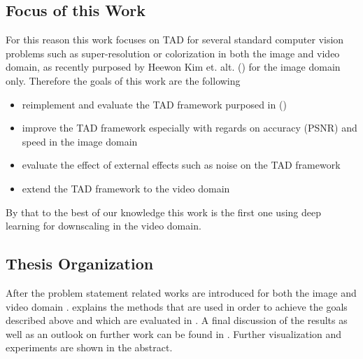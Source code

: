 \subsection{Focus of this Work}
For this reason this work focuses on \ac{TAD} for several standard
computer vision problems such as super-resolution or colorization in both the
image and video domain, as recently purposed by Heewon Kim et. alt. (\cite{TAID})
for the image domain only. Therefore the goals of this work are the following

\begin{itemize}
\item reimplement and evaluate the TAD framework purposed in (\cite{TAID})
\item improve the TAD framework especially with regards on accuracy
(PSNR) and speed in the image domain
\item evaluate the effect of external effects such as noise on the TAD
framework
\item extend the TAD framework to the video domain
\end{itemize}

By that to the best of our knowledge this work is the first one using deep
learning for downscaling in the video domain.

\subsection{Thesis Organization}
After the problem statement  related works are
introduced for both the image and video domain .
 explains the methods that are used in order to
achieve the goals described above and which are evaluated in
. A final discussion of the results
as well as an outlook on further work can be found in
. Further visualization and experiments are
shown in the abstract.

%
